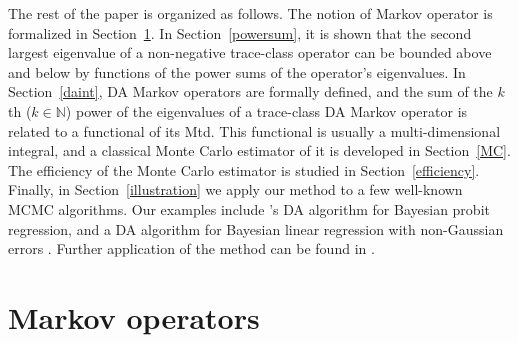 \documentclass[11pt]{article}
\newcommand{\pcite}[1]{\citeauthor{#1}'s \citeyearpar{#1}}
\begin{document}
        
        
        
	
	The rest of the paper is organized as follows.  The notion of
        Markov operator is formalized in
        Section~\ref{MarkovOperators}.  In Section~\ref{powersum}, it
        is shown that the second largest eigenvalue of a non-negative
        trace-class operator can be bounded above and below by
        functions of the power sums of the operator's eigenvalues.  In
        Section~\ref{daint}, DA Markov operators are formally defined,
        and the sum of the $k$th ($k\in \mathbb{N}$) power of the
        eigenvalues of a trace-class DA Markov operator is related to
        a functional of its Mtd.  This functional is usually a
        multi-dimensional integral, and a classical Monte Carlo
        estimator of it is developed in Section~\ref{MC}. The efficiency of the Monte Carlo estimator is studied in Section~\ref{efficiency}.  Finally, in
        Section~\ref{illustration} we apply our method to a few
        well-known MCMC algorithms.  Our examples include
        \pcite{albert1993bayesian} DA algorithm for Bayesian probit
        regression, and a DA algorithm for Bayesian linear regression
        with non-Gaussian errors \citep{liu1996bayesian}.
        Further application of the method can be found in \cite{zhang2019trace}.
        
	
	\section{Markov operators} \label{MarkovOperators}
	
\end{document}
